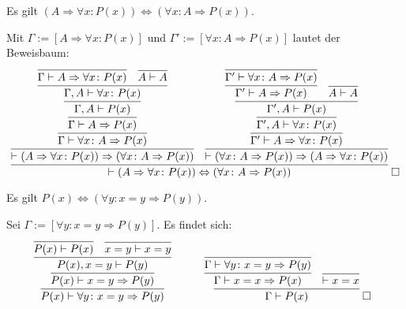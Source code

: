 \begin{Satz}\label{imp-dl}
Es gilt $(A\Rightarrow\forall x\colon P(x))\Leftrightarrow (\forall x\colon A\Rightarrow P(x))$.
\end{Satz}
\begin{Beweis}
Mit $\Gamma:=[A\Rightarrow\forall x\colon P(x)]$
und $\Gamma':=[\forall x\colon A\Rightarrow P(x)]$
lautet der Beweisbaum:
\[
\infer{\vdash (A\Rightarrow\forall x\colon P(x))\Leftrightarrow (\forall x\colon A\Rightarrow P(x))}{
  \infer{\vdash (A\Rightarrow\forall x\colon P(x))\Rightarrow (\forall x\colon A\Rightarrow P(x))}{
    \infer{\Gamma\vdash\forall x\colon A\Rightarrow P(x)}{
      \infer{\Gamma\vdash A\Rightarrow P(x)}{
        \infer{\Gamma, A\vdash P(x)}{
          \infer{\Gamma, A\vdash\forall x\colon P(x)}{
            \infer{\Gamma\vdash A\Rightarrow\forall x\colon P(x)}{}
          & \infer{A\vdash A}{}}}}}}
& \infer{\vdash (\forall x\colon A\Rightarrow P(x))\Rightarrow (A\Rightarrow\forall x\colon P(x))}{
    \infer{\Gamma'\vdash A\Rightarrow\forall x\colon P(x)}{
      \infer{\Gamma', A\vdash\forall x\colon P(x)}{
        \infer{\Gamma', A\vdash P(x)}{
          \infer{\Gamma'\vdash A\Rightarrow P(x)}{
            \infer{\Gamma'\vdash\forall x\colon A\Rightarrow P(x)}{}
          }
        & \infer{A\vdash A}{}}}}}}\;\qedsymbol
\]
\end{Beweis}

\begin{Satz}\label{redundant-eq}
Es gilt $P(x)\Leftrightarrow (\forall y\colon x=y\Rightarrow P(y))$.
\end{Satz}
\begin{Beweis}
Sei $\Gamma:=[\forall y\colon x=y\Rightarrow P(y)]$. Es findet sich:
\[
\begin{array}{@{}l@{\qquad\quad}l}
\infer{P(x)\vdash\forall y\colon x=y\Rightarrow P(y)}{
  \infer{P(x)\vdash x=y\Rightarrow P(y)}{
    \infer{P(x),x=y\vdash P(y)}{
      \infer{P(x)\vdash P(x)}{} & \infer{x=y\vdash x=y}{}}}}
&
\infer{\Gamma\vdash P(x)}{
  \infer{\Gamma\vdash x=x\Rightarrow P(x)}{
    \infer{\Gamma\vdash\forall y\colon x=y\Rightarrow P(y)}{}}
& \infer{\vdash x=x}{}}\;\qedsymbol
\end{array}
\]
\end{Beweis}


